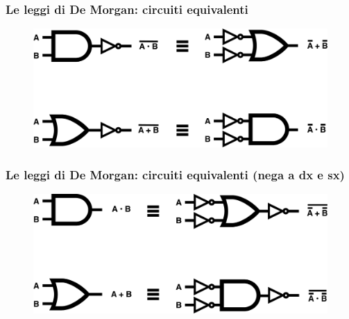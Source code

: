 \begin{frame}
	\frametitle{Le leggi di De Morgan: circuiti equivalenti}

	\begin{figure}[!htbp]
		\centering 
		\includegraphics[width=0.8\linewidth]{images/2_elettronica/demorgan_1.pdf}
	\end{figure}
	
\end{frame}

\begin{frame}
	\frametitle{Le leggi di De Morgan: circuiti equivalenti (nega a dx e sx)}
	
	\begin{figure}[!htbp]
		\centering 
		\includegraphics[width=0.8\linewidth]{images/2_elettronica/demorgan_2.pdf}
	\end{figure}
\end{frame}



